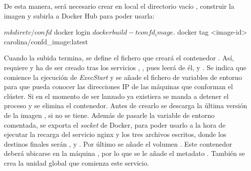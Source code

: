 De esta manera, será necesario crear en local el directorio vacío , construir la imagen y subirla a Docker Hub para poder usarla:

\begin{code}
$ mkdir etc/confd
$ docker login
$ docker build -t confd_image .
$ docker tag <image-id> carolina/confd_image:latest
\end{code}

Cuando la subida termina, se define el fichero  que creará el contenedor . Así, requiere y ha de ser creado tras los servicios , , pues leerá de él, y . Se indica que comience la ejecución de \textit{ExecStart} y se añade el fichero de variables de entorno  para que pueda conocer las direcciones IP de las máquinas que conforman el clúster. Si en el momento de ser lanzado ya existiera se manda a detener el proceso y se elimina el contenedor. Antes de crearlo se descarga la última versión de la imagen , si no se tiene. Además de pasarle la variable de entorno comentada, se exporta el \textit{socket} de Docker, para poder usarlo a la hora de ejecutar la recarga del servicio nginx y los tres archivos escritos, donde los destinos finales serán ,  y . Por último se añade el volumen . Este contenedor deberá ubicarse en la máquina , por lo que se le añade el metadato . También se crea la unidad global  que comienza este servicio.

